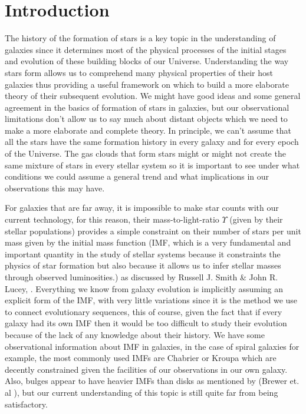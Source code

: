 \chapter{Introduction}

The history of the formation of stars is a key topic in the understanding of galaxies since it determines most of the physical processes of the initial stages and evolution of these building blocks of our Universe. Understanding the way stars form allows us to comprehend many physical properties of their host galaxies thus providing a useful framework on which to build a more elaborate theory of their subsequent evolution. We might have good ideas and some general agreement in the basics of formation of stars in galaxies, but our observational limitations don't allow us to say much about distant objects which we need to make a more elaborate and complete theory. In principle, we can't assume that all the stars have the same formation history in every galaxy and for every epoch of the Universe. The gas clouds that form stars might or might not create the same mixture of stars in every stellar system so it is important to see under what conditions we could assume a general trend and what implications in our observations this may have.

For galaxies that are far away, it is impossible to make star counts with our current technology, for this reason, their mass-to-light-ratio $\Upsilon$ (given by their stellar populations) provides a simple constraint on their number of stars per unit mass given by the initial mass function  (IMF, which is a very fundamental and important quantity in the study of stellar systems because it constraints the physics of star formation but also because it allows us to infer stellar masses through observed luminosities.) as discussed by Russell J. Smith \& John R. Lucey, \citeyear{Reference7}. Everything we know from galaxy evolution is implicitly assuming an explicit form of the IMF, with very little variations since it is the method we use to connect evolutionary sequences, this of course, given the fact that if every galaxy had its own IMF then it would be too difficult to study their evolution because of the lack of any knowledge about their history. We have some observational information about IMF in galaxies, in the case of spiral galaxies for example, the most commonly used IMFs are Chabrier or Kroupa which are decently constrained given the facilities of our observations in our own galaxy. Also, bulges appear to have heavier IMFs than disks as mentioned by (Brewer et. al \citeyear{Reference16}), but our current understanding of this topic is still quite far from being satisfactory.

